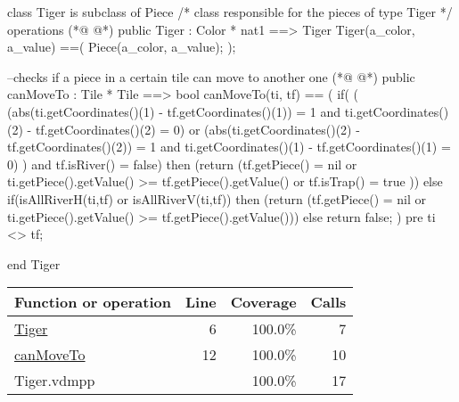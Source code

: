 \begin{vdmpp}[breaklines=true]
class Tiger is subclass of Piece
/*
class responsible for the pieces of type Tiger
*/
operations
(*@
\label{Tiger:6}
@*)
 public Tiger : Color * nat1 ==> Tiger
   Tiger(a_color, a_value) ==(
    Piece(a_color, a_value);
   );
   
 --checks if a piece in a certain tile can move to another one
(*@
\label{canMoveTo:12}
@*)
 public canMoveTo : Tile * Tile  ==> bool
 canMoveTo(ti, tf) 
  ==  (
    if(
       (
       (abs(ti.getCoordinates()(1) - tf.getCoordinates()(1)) = 1 and ti.getCoordinates()(2) - tf.getCoordinates()(2) = 0) or 
       (abs(ti.getCoordinates()(2) - tf.getCoordinates()(2)) = 1 and ti.getCoordinates()(1) - tf.getCoordinates()(1) = 0)
       ) 
      and tf.isRiver() = false)
      then (return (tf.getPiece() = nil or ti.getPiece().getValue() >= tf.getPiece().getValue() or tf.isTrap() = true )) 
    else if(isAllRiverH(ti,tf) or isAllRiverV(ti,tf))
       then (return (tf.getPiece() = nil or ti.getPiece().getValue() >= tf.getPiece().getValue()))
    else
      return false;
    )
 pre ti <> tf;
 
end Tiger
\end{vdmpp}
\bigskip
\begin{longtable}{|l|r|r|r|}
\hline
Function or operation & Line & Coverage & Calls \\
\hline
\hline
\hyperref[Tiger:6]{Tiger} & 6&100.0\% & 7 \\
\hline
\hyperref[canMoveTo:12]{canMoveTo} & 12&100.0\% & 10 \\
\hline
\hline
Tiger.vdmpp & & 100.0\% & 17 \\
\hline
\end{longtable}

